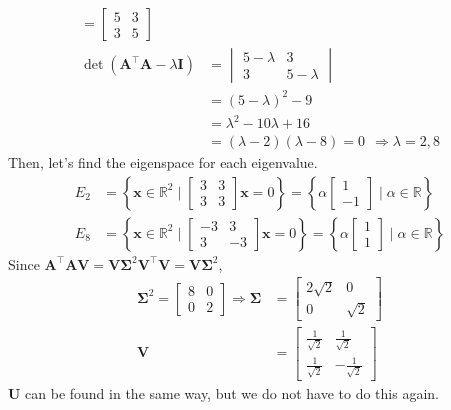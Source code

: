 \documentclass[11pt]{article}
\begin{document}
\begin{enumerate}
\begin{align*}
=\begin{bmatrix}5&3\\3&5\end{bmatrix} \\
\det(\bm{A^{\top}A}-\lambda\bm I)
& =\begin{vmatrix}5-\lambda&3\\3&5-\lambda\end{vmatrix} \\
& =(5-\lambda)^{2}-9 \\
& =\lambda^{2}-10\lambda+16 \\
& =(\lambda-2)(\lambda-8)=0 \ \ \Rightarrow \lambda=2,8
\end{align*}
Then, let's find the eigenspace for each eigenvalue.
\begin{align*}
E_{2} & =\left\{\bm x\in\mathbb{R}^{2}\mid
\begin{bmatrix}3&3\\3&3\end{bmatrix}\bm x=0\right\}
=\left\{\alpha\begin{bmatrix}1\\-1\end{bmatrix}\mid\alpha\in\mathbb{R}\right\}\\
E_{8} & =\left\{\bm x\in\mathbb{R}^{2}\mid
\begin{bmatrix}-3&3\\3&-3\end{bmatrix}\bm x=0\right\}
=\left\{\alpha\begin{bmatrix}1\\1\end{bmatrix}\mid\alpha\in\mathbb{R}\right\}
\end{align*}
Since $\bm A^{\top}\bm{AV}=\bm{V\Sigma}^{2}\bm V^{\top}\bm V=\bm{V\Sigma}^{2}$,
\begin{align*}
\bm\Sigma^{2}=\begin{bmatrix}8&0\\0&2\end{bmatrix}
\Rightarrow \bm\Sigma & =\begin{bmatrix}2\sqrt{2}&0\\0&\sqrt{2}\end{bmatrix}\\
\bm V & =\begin{bmatrix}\frac{1}{\sqrt{2}}&\frac{1}{\sqrt{2}}\\
                        \frac{1}{\sqrt{2}}&-\frac{1}{\sqrt{2}}\end{bmatrix}
\end{align*}
$\bm U$ can be found in the same way, but we do not have to do this again.

\end{enumerate}
\end{document}
